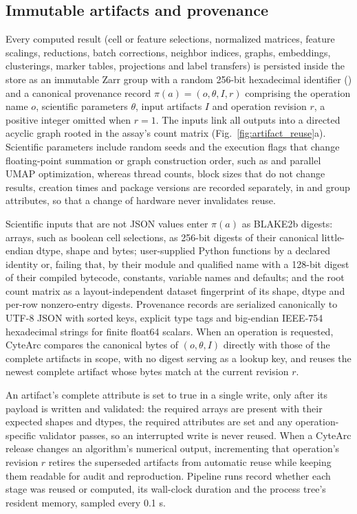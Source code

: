 \documentclass[11pt]{article}
\begin{document}
\subsection*{Immutable artifacts and provenance}\label{sec:Artifacts and provenance}

Every computed result (cell or feature selections, normalized matrices, feature scalings, reductions, batch corrections, neighbor indices, graphs, embeddings, clusterings, marker tables, projections and label transfers) is persisted inside the store as an immutable Zarr group with a random 256-bit hexadecimal identifier () and a canonical provenance record $\pi(a)=(o,\theta,I,r)$ comprising the operation name $o$, scientific parameters $\theta$, input artifacts $I$ and operation revision $r$, a positive integer omitted when $r=1$. The inputs link all outputs into a directed acyclic graph rooted in the assay's count matrix (Fig.~\ref{fig:artifact_reuse}a). Scientific parameters include random seeds and the execution flags that change floating-point summation or graph construction order, such as  and parallel UMAP optimization, whereas thread counts, block sizes that do not change results, creation times and package versions are recorded separately, in  and group attributes, so that a change of hardware never invalidates reuse.

Scientific inputs that are not JSON values enter $\pi(a)$ as BLAKE2b digests: arrays, such as boolean cell selections, as 256-bit digests of their canonical little-endian dtype, shape and bytes; user-supplied Python functions by a declared identity or, failing that, by their module and qualified name with a 128-bit digest of their compiled bytecode, constants, variable names and defaults; and the root count matrix as a layout-independent dataset fingerprint of its shape, dtype and per-row nonzero-entry digests. Provenance records are serialized canonically to UTF-8 JSON with sorted keys, explicit type tags and big-endian IEEE-754 hexadecimal strings for finite float64 scalars. When an operation is requested, CyteArc compares the canonical bytes of $(o,\theta,I)$ directly with those of the complete artifacts in scope, with no digest serving as a lookup key, and reuses the newest complete artifact whose bytes match at the current revision $r$.

An artifact's complete attribute is set to true in a single write, only after its payload is written and validated: the required arrays are present with their expected shapes and dtypes, the required attributes are set and any operation-specific validator passes, so an interrupted write is never reused. When a CyteArc release changes an algorithm's numerical output, incrementing that operation's revision $r$ retires the superseded artifacts from automatic reuse while keeping them readable for audit and reproduction. Pipeline runs record whether each stage was reused or computed, its wall-clock duration and the process tree's resident memory, sampled every 0.1 s.
\end{document}
